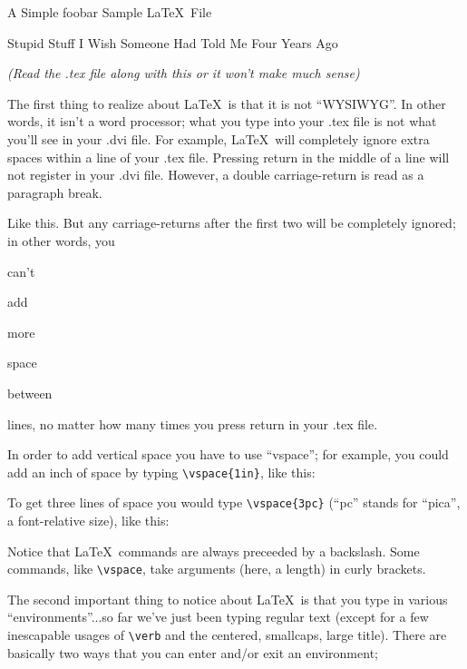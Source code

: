 ﻿\documentclass{article}
\begin{document}
\centerline{\sc \large A Simple foobar Sample \LaTeX\ File}
\vspace{.5pc}
\centerline{\sc Stupid Stuff I Wish Someone Had Told Me Four Years Ago}
\centerline{\it (Read the .tex file along with this or it won't 
            make much sense)}
\vspace{2pc}

The first thing to realize about \LaTeX\ is that it is not ``WYSIWYG''. 
In other words, it isn't a word processor; what you type into your 
.tex file is not what you'll see in your .dvi file.  For example, 
\LaTeX\ will      completely     ignore               extra
spaces    within                             a line of your .tex file.
Pressing return
in 
the 
middle 
of
a
line
will not register in your .dvi file. However, a double carriage-return
is read as a paragraph break.

Like this.  But any carriage-returns after the first two will be 
completely ignored; in other words, you 


can't 

add






more 




space 


between 




lines, no matter how many times you press return in your .tex file.

In order to add vertical space you have to use ``vspace''; for example, 
you could add an inch of space by typing \verb|\vspace{1in}|, like this:
\vspace{1in}

To get three lines of space you would type \verb|\vspace{3pc}|
(``pc'' stands for ``pica'', a font-relative size), like this:
\vspace{3pc}

Notice that \LaTeX\ commands are always preceeded by a backslash.  
Some commands, like \verb|\vspace|, take arguments (here, a length) in
curly brackets.  

The second important thing to notice about \LaTeX\ is that you type 
in various ``environments''...so far we've just been typing regular 
text (except for a few inescapable usages of \verb|\verb| and the
centered, smallcaps, large title).  There are basically two ways that 
you can enter and/or exit an environment;
\vspace{1pc}
\end{document}
